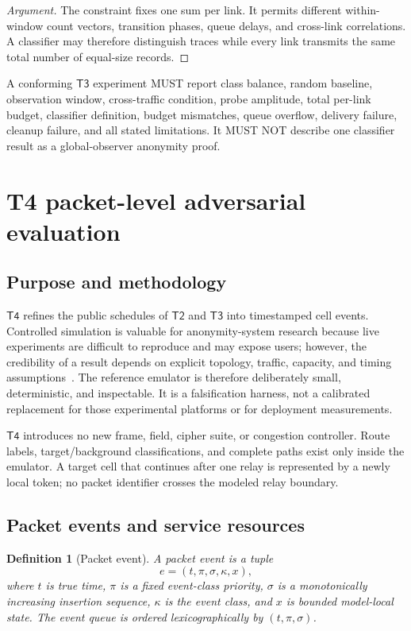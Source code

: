 \documentclass[11pt,oneside]{article}
\newcommand{\Ttwo}{\ensuremath{\mathsf{T2}}}
\newcommand{\Tthree}{\ensuremath{\mathsf{T3}}}
\newcommand{\Tfour}{\ensuremath{\mathsf{T4}}}
\newtheorem{definition}{Definition}
\begin{document}
\begin{proof}[Argument]
The constraint fixes one sum per link. It permits different within-window count vectors, transition phases, queue delays, and cross-link correlations. A classifier may therefore distinguish traces while every link transmits the same total number of equal-size records.
\end{proof}

A conforming \Tthree{} experiment MUST report class balance, random baseline, observation window, cross-traffic condition, probe amplitude, total per-link budget, classifier definition, budget mismatches, queue overflow, delivery failure, cleanup failure, and all stated limitations. It MUST NOT describe one classifier result as a global-observer anonymity proof.

\section{T4 packet-level adversarial evaluation}
\label{sec:t4}

\subsection{Purpose and methodology}

\Tfour{} refines the public schedules of \Ttwo{} and \Tthree{} into timestamped cell events. Controlled simulation is valuable for anonymity-system research because live experiments are difficult to reproduce and may expose users; however, the credibility of a result depends on explicit topology, traffic, capacity, and timing assumptions~\cite{shadow2012,tormodel2012}. The reference emulator is therefore deliberately small, deterministic, and inspectable. It is a falsification harness, not a calibrated replacement for those experimental platforms or for deployment measurements.

\Tfour{} introduces no new frame, field, cipher suite, or congestion controller. Route labels, target/background classifications, and complete paths exist only inside the emulator. A target cell that continues after one relay is represented by a newly local token; no packet identifier crosses the modeled relay boundary.

\subsection{Packet events and service resources}

\begin{definition}[Packet event]
A packet event is a tuple
\begin{equation}
  e=(t,\pi,\sigma,\kappa,x),
\label{eq:t4event}
\end{equation}
where $t$ is true time, $\pi$ is a fixed event-class priority, $\sigma$ is a monotonically increasing insertion sequence, $\kappa$ is the event class, and $x$ is bounded model-local state. The event queue is ordered lexicographically by $(t,\pi,\sigma)$.
\end{definition}
\end{document}
